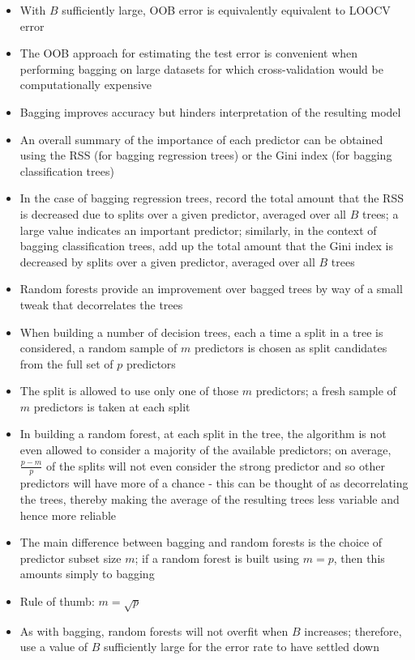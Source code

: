 \documentclass[12pt]{article}
\begin{document}
\begin{itemize}
\item With $B$ sufficiently large, OOB error is equivalently equivalent to LOOCV error 
\item The OOB approach for estimating the test error is convenient when performing bagging on large datasets for which cross-validation would be computationally expensive 
\item Bagging improves accuracy but hinders interpretation of the resulting model 
\item An overall summary of the importance of each predictor can be obtained using the RSS (for bagging regression trees) or the Gini index (for bagging classification trees)
\item In the case of bagging regression trees, record the total amount that the RSS is decreased due to splits over a given predictor, averaged over all $B$ trees; a large value indicates an important predictor; similarly, in the context of bagging classification trees, add up the total amount that the Gini index is decreased by splits over a given predictor, averaged over all $B$ trees
\item Random forests provide an improvement over bagged trees by way of a small tweak that decorrelates the trees
\item When building a number of decision trees, each a time a split in a tree is considered, a random sample of $m$ predictors is chosen as split candidates from the full set of $p$ predictors
\item The split is allowed to use only one of those $m$ predictors; a fresh sample of $m$ predictors is taken at each split
\item In building a random forest, at each split in the tree, the algorithm is not even allowed to consider a majority of the available predictors; on average, $\frac{p-m}{p}$ of the splits will not even consider the strong predictor and so other predictors will have more of a chance - this can be thought of as decorrelating the trees, thereby making the average of the resulting trees less variable and hence more reliable 
\item The main difference between bagging and random forests is the choice of predictor subset size $m$; if a random forest is built using $m=p$, then this amounts simply to bagging 
\item Rule of thumb: $m = \sqrt{p}$
\item As with bagging, random forests will not overfit when $B$ increases; therefore, use a value of $B$ sufficiently large for the error rate to have settled down 

\end{itemize}
\end{document}
